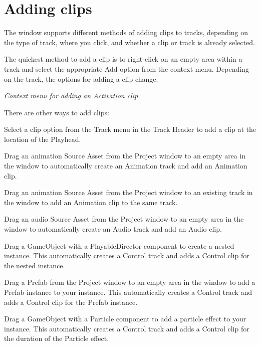 \chapter{Adding clips}
\hypertarget{md__hey_tea_9_2_library_2_package_cache_2com_8unity_8timeline_0d1_87_85_2_documentation_0i_2clp__add}{}\label{md__hey_tea_9_2_library_2_package_cache_2com_8unity_8timeline_0d1_87_85_2_documentation_0i_2clp__add}
\label{md__hey_tea_9_2_library_2_package_cache_2com_8unity_8timeline_0d1_87_85_2_documentation_0i_2clp__add_autotoc_md4608}%
%
 The  window supports different methods of adding clips to tracks, depending on the type of track, where you click, and whether a clip or track is already selected.

The quickest method to add a clip is to right-\/click on an empty area within a track and select the appropriate Add option from the context menu. Depending on the track, the options for adding a clip change.



{\itshape Context menu for adding an Activation clip.}

There are other ways to add clips\+:


\begin{DoxyItemize}
\item Select a clip option from the Track menu in the Track Header to add a clip at the location of the  Playhead.
\item Drag an animation Source Asset from the Project window to an empty area in the  window to automatically create an Animation track and add an Animation clip.
\item Drag an animation Source Asset from the Project window to an existing track in the  window to add an Animation clip to the same track.
\item Drag an audio Source Asset from the Project window to an empty area in the  window to automatically create an Audio track and add an Audio clip.
\item Drag a Game\+Object with a Playable\+Director component to create a nested  instance. This automatically creates a Control track and adds a Control clip for the nested  instance.
\item Drag a Prefab from the Project window to an empty area in the  window to add a Prefab instance to your  instance. This automatically creates a Control track and adds a Control clip for the Prefab instance.
\item Drag a Game\+Object with a Particle component to add a particle effect to your  instance. This automatically creates a Control track and adds a Control clip for the duration of the Particle effect.
\end{DoxyItemize}

